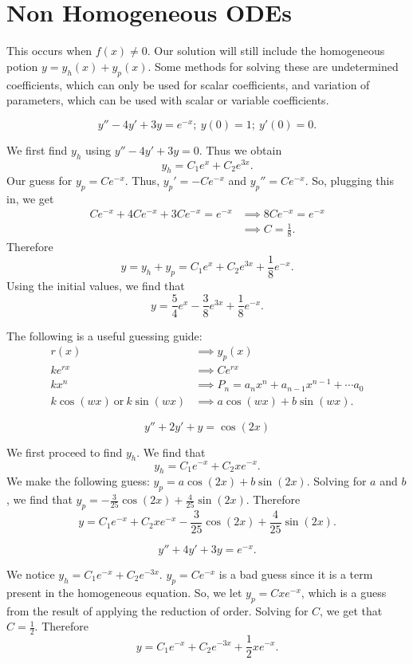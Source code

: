 \section{Non Homogeneous ODEs}
This occurs when $f(x) \neq 0$.
Our solution will still include the homogeneous potion
$y = y_h(x) + y_p(x)$. Some methods for solving these are
\alert{undetermined coefficients}, which can only be used for scalar coefficients,
and \alert{variation of parameters}, which can be used with scalar or variable 
coefficients.
\newpage
\begin{example}
    $$y''-4y' + 3y = e^{-x};~y(0) = 1;~y'(0)=0.$$
\end{example}
\begin{soln}
    We first find $y_h$ using $y''-4y'+3y = 0$. Thus we obtain
    $$y_h = C_1e^x+C_2e^{3x}.$$ Our guess for $y_p = Ce^{-x}$.
    Thus, $y_p' = -Ce^{-x}$ and $y_p'' = Ce^{-x}$. So, plugging this in,
    we get 
    \begin{align*}
        Ce^{-x}+4Ce^{-x}+3Ce^{-x} = e^{-x} &\implies 8Ce^{-x} = e^{-x} \\
                                           &\implies C = \frac{1}{8}.
    \end{align*}
    Therefore $$y = y_h + y_p = C_1e^{x}+C_2e^{3x} + \frac{1}{8}e^{-x}.$$
    Using the initial values, we find that
    $$\boxed{y = \frac{5}{4}e^{x}-\frac{3}{8}e^{3x} + \frac{1}{8}e^{-x}}.$$
\end{soln}
The following is a useful guessing guide:
\begin{align*}
    r(x) &\implies y_p(x) \\
    ke^{rx} &\implies Ce^{rx} \\
    kx^n &\implies P_n = a_nx^n + a_{n-1}x^{n-1} + \cdots a_0 \\
    k\cos(wx)~\text{or}~k\sin(wx) &\implies a\cos(wx)+b\sin(wx).
\end{align*}
\begin{example}
   $$ y''+2y'+y = \cos(2x)$$
\end{example}
\begin{soln}
    We first proceed to find $y_h$. We find that
    $$y_h = C_1e^{-x}+C_2xe^{-x}.$$
    We make the following guess: $y_p = a\cos(2x) + b\sin(2x)$. Solving
    for $a$ and $b$, we find that $y_p = -\frac{3}{25}\cos(2x) + \frac{4}{25}\sin(2x)$.
    Therefore 
    $$\boxed{y = C_1e^{-x}+C_2xe^{-x} - \frac{3}{25}\cos(2x)+\frac{4}{25}\sin(2x)}.$$
\end{soln}
\begin{example}
    $$y''+4y'+3y = e^{-x}.$$
\end{example}
\begin{soln}
    We notice $y_h = C_1e^{-x} + C_2e^{-3x}$. $y_p = Ce^{-x}$ is a bad guess since it is a term present in the
    homogeneous equation. So, we let $y_p = Cxe^{-x}$, which is a guess from
    the result of applying the reduction of order. Solving for $C$, we get
    that $C = \frac{1}{2}$. Therefore 
    $$\boxed{y = C_1e^{-x}+C_2e^{-3x}+\frac{1}{2}xe^{-x}}.$$
\end{soln}





